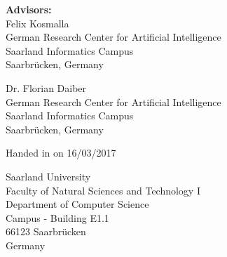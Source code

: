 \pagestyle{empty}

\vspace*{0.5cm}
\textbf{Advisors:}\\
Felix Kosmalla\\
German Research Center for Artificial Intelligence\\
Saarland Informatics Campus\\
Saarbrücken, Germany

\vspace*{0.5cm}
Dr. Florian Daiber\\
German Research Center for Artificial Intelligence\\
Saarland Informatics Campus\\
Saarbrücken, Germany


\vspace{3.5cm}
Handed in on 16/03/2017


\vspace{3.5cm}


\vspace{3cm}
Saarland University\\
Faculty of Natural Sciences and Technology I\\
Department of Computer Science\\
Campus - Building E1.1\\
66123 Saarbrücken\\
Germany\\


